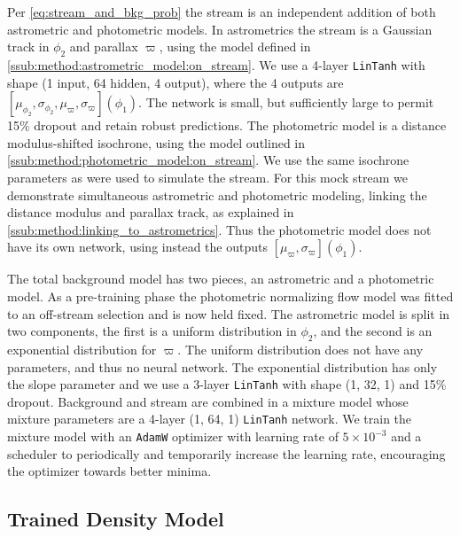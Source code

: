 \documentclass[twocolumn]{aastex631}
\newcommand{\parallax}{\varpi}
\begin{document}
        Per \autoref{eq:stream_and_bkg_prob} the stream is an independent
        addition of both astrometric and photometric models.  In astrometrics
        the stream is a Gaussian track in $\phi_2$ and parallax $\parallax$, using
        the model defined in \autoref{ssub:method:astrometric_model:on_stream}.
        We use a 4-layer \texttt{LinTanh} with shape (1 input, 64 hidden, 4
        output), where the 4 outputs are $[\mu_{\phi_2}, \sigma_{\phi_2},
        \mu_{\parallax}, \sigma_{\parallax}](\phi_1)$.  The network is small, but
        sufficiently large to permit 15\% dropout and retain robust predictions.
        The photometric model is a distance modulus-shifted isochrone, using the
        model outlined in  \autoref{ssub:method:photometric_model:on_stream}. We
        use the same isochrone parameters as were used to simulate the stream.
        For this mock stream we demonstrate simultaneous astrometric and
        photometric modeling, linking the distance modulus and parallax track,
        as explained in \autoref{ssub:method:linking_to_astrometrics}. Thus the
        photometric model does not have its own network, using instead the
        outputs $[\mu_{\parallax}, \sigma_{\parallax}](\phi_1)$.

        The total background model has two pieces, an astrometric and a
        photometric model.  As a pre-training phase the photometric normalizing
        flow model was fitted to an off-stream selection and is now held fixed.
        The astrometric model is split in two components, the first is a uniform
        distribution in $\phi_2$, and the second is an exponential distribution
        for $\parallax$.  The uniform distribution does not have any parameters,
        and thus no neural network.  The exponential distribution has only the
        slope parameter and we use a 3-layer \texttt{LinTanh} with shape (1, 32,
        1) and 15\% dropout. Background and stream are combined in a mixture
        model whose mixture parameters are a 4-layer (1, 64, 1) \texttt{LinTanh}
        network. We train the mixture model with an \texttt{AdamW} optimizer
        with learning rate of $5\times10^{-3}$ and a scheduler to periodically
        and temporarily increase the learning rate, encouraging the optimizer
        towards better minima.

    \subsection{Trained Density Model} \label{sub:results_mock:results}
\end{document}
